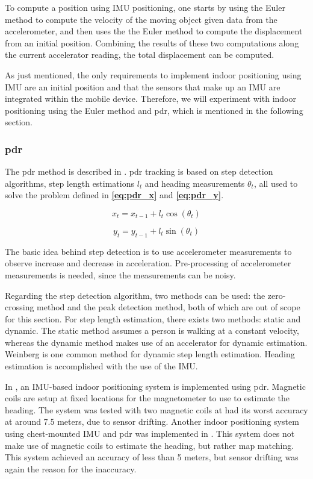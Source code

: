 To compute a position using IMU positioning, one starts by using the Euler method to compute the velocity of the moving object given data from the accelerometer, and then uses the the Euler method to compute the displacement from an initial position. Combining the results of these two computations along the current accelerator reading, the total displacement can be computed.

As just mentioned, the only requirements to implement indoor positioning using IMU are an initial position and that the sensors that make up an IMU are integrated within the mobile device. Therefore, we will experiment with indoor positioning using the Euler method and \gls{pdr}, which is mentioned in the following section.

\subsubsection{\acrlong{pdr}}\label{sec:pdr}
The \gls{pdr} method is described in \cite{HybridPositioningPaper}. \gls{pdr} tracking is based on step detection algorithms, step length estimations $l_t$ and heading measurements $\theta_t$, all used to solve the problem defined in \textbf{\autoref{eq:pdr_x}} and \textbf{\autoref{eq:pdr_y}}.

\begin{equation} \label{eq:pdr_x}
    x_t = x_{t - 1} + l_t\cos(\theta_t)
\end{equation}

\begin{equation} \label{eq:pdr_y}
    y_t = y_{t - 1} + l_t\sin(\theta_t)
\end{equation}

The basic idea behind step detection is to use accelerometer measurements to observe increase and decrease in acceleration.
Pre-processing of accelerometer measurements is needed, since the measurements can be noisy.

Regarding the step detection algorithm, two methods can be used: the zero-crossing method and the peak detection method, both of which are out of scope for this section.
For step length estimation, there exists two methods: static and dynamic. The static method assumes a person is walking at a constant velocity, whereas the dynamic method makes use of an accelerator for dynamic estimation. Weinberg is one common method for dynamic step length estimation. Heading estimation is accomplished with the use of the IMU.

In \cite{IMUPaper}, an IMU-based indoor positioning system is implemented using \gls{pdr}. Magnetic coils are setup at fixed locations for the magnetometer to use to estimate the heading. The system was tested with two magnetic coils at had its worst accuracy at around 7.5 meters, due to sensor drifting.
Another indoor positioning system using chest-mounted IMU and \gls{pdr} was implemented in \cite{s19020420}. This system does not make use of magnetic coils to estimate the heading, but rather map matching. This system achieved an accuracy of less than 5 meters, but sensor drifting was again the reason for the inaccuracy.